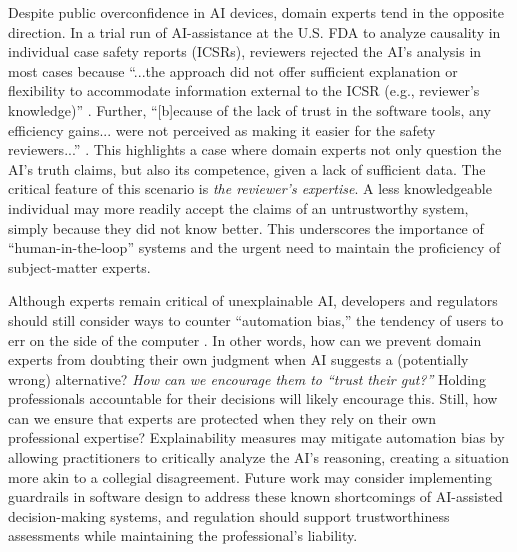 \documentclass[preprint,12pt]{elsarticle}
\begin{document}
Despite public overconfidence in AI devices, domain experts tend in the opposite
direction. In a trial run of AI-assistance at the U.S. FDA to analyze causality
in individual case safety reports (ICSRs), reviewers rejected the AI's analysis
in most cases because ``...the approach did not offer sufficient explanation or
flexibility to accommodate information external to the ICSR (e.g., reviewer's
knowledge)'' \cite{ballTrustVerifyLessons2024}. Further, ``[b]ecause of the lack
of trust in the software tools, any efficiency gains... were not perceived as
making it easier for the safety reviewers...''
\cite{ballTrustVerifyLessons2024}. This highlights a case where domain experts
not only question the AI's truth claims, but also its competence, given a lack
of sufficient data. The critical feature of this scenario is \textit{the
reviewer's expertise}. A less knowledgeable individual may more readily accept
the claims of an untrustworthy system, simply because they did not know better.
This underscores the importance of ``human-in-the-loop'' systems and the urgent
need to maintain the proficiency of subject-matter experts. 

Although experts remain critical of unexplainable AI, developers and regulators
should still consider ways to counter ``automation bias,'' the tendency of users
to err on the side of the computer
\cite{jonesArtificialIntelligenceClinical2023}. In other words, how can we
prevent domain experts from doubting their own judgment when AI suggests a
(potentially wrong) alternative? \textit{How can we encourage them to ``trust
their gut?''} Holding professionals accountable for their decisions will likely
encourage this. Still, how can we ensure that experts are protected when they
rely on their own professional expertise? Explainability measures may mitigate
automation bias by allowing practitioners to critically analyze the AI's
reasoning, creating a situation more akin to a collegial disagreement. Future
work may consider implementing guardrails in software design to address these
known shortcomings of AI-assisted decision-making systems, and regulation should
support trustworthiness assessments while maintaining the professional's
liability.
\end{document}

